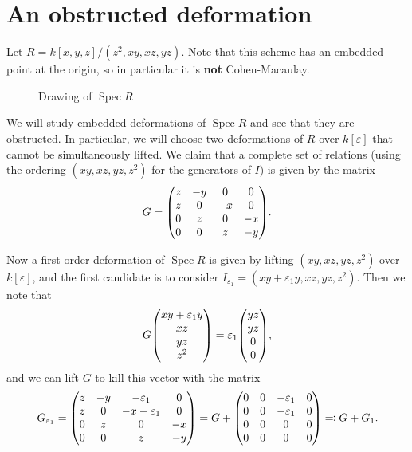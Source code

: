 \documentclass{amsart}
\theoremstyle{definition}
\theoremstyle{remark}
\theoremstyle{plain}
\theoremstyle{definition}
\theoremstyle{remark}
\newcommand{\ep}{\varepsilon}
\newcommand{\1}{\mathbf{1}}
\newcommand{\2}{\mathbf{2}}
\newcommand{\3}{\mathbf{3}}
\DeclareMathOperator{\Spec}{Spec}
\begin{document}
\section{An obstructed deformation}%
\label{sec:an_obstructed_deformation}

Let $R = k[x,y,z]/(z^2, xy, xz, yz)$. Note that this scheme has an embedded point at the origin, so in particular it is \textbf{not} Cohen-Macaulay.

\begin{figure}[H]
\begin{center}
\end{center}
\caption{Drawing of $\Spec R$}%
\label{fig:}
\end{figure}

We will study embedded deformations of $\Spec R$ and see that they are obstructed. In particular, we will choose two deformations of $R$ over $k[\ep]$ that cannot be simultaneously lifted. We claim that a complete set of relations (using the ordering $(xy, xz, yz, z^2)$ for the generators of $I$) is given by the matrix
\[ G = \mqty(z & -y & 0 & 0 \\ z & 0 & -x & 0 \\ 0 & z & 0 & -x \\ 0 & 0 & z & -y). \]

Now a first-order deformation of $\Spec R$ is given by lifting $(xy,xz,yz,z^2)$ over $k[\ep]$, and the first candidate is to consider $I_{\ep_1} = (xy + \ep_1 y, xz, yz, z^2)$. Then we note that
\[ G \mqty(xy+\ep_1 y \\ xz \\ yz \\ z^2) = \ep_1 \mqty(yz \\ yz \\ 0 \\ 0), \]
and we can lift $G$ to kill this vector with the matrix
\[ G_{\ep_1} = \mqty(z & -y & -\ep_1 & 0 \\ z & 0 & -x-\ep_1 & 0 \\ 0 & z & 0 & -x \\ 0 & 0 & z & -y) = G + \mqty(0 & 0 & -\ep_1 & 0 \\ 0 & 0 & -\ep_1 & 0 \\ 0 & 0 & 0 & 0 \\ 0 & 0 & 0 & 0) \eqqcolon G + G_1. \]
\end{document}
